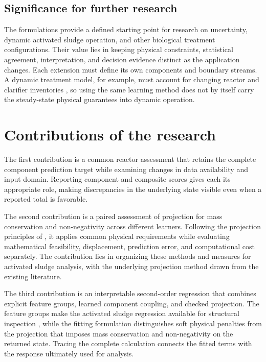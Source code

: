 \subsection{Significance for further research}

The formulations provide a defined starting point for research on uncertainty, dynamic activated sludge operation, and other biological treatment configurations. Their value lies in keeping physical constraints, statistical agreement, interpretation, and decision evidence distinct as the application changes. Each extension must define its own components and boundary streams. A dynamic treatment model, for example, must account for changing reactor and clarifier inventories \citep{Takacs1991,Alex2008}, so using the same learning method does not by itself carry the steady-state physical guarantees into dynamic operation.

\section{Contributions of the research}

The first contribution is a common reactor assessment that retains the complete component prediction target while examining changes in data availability and input domain. Reporting component and composite scores gives each its appropriate role, making discrepancies in the underlying state visible even when a reported total is favorable.

The second contribution is a paired assessment of projection for mass conservation and non-negativity across different learners. Following the projection principles of \citet{KircherVotsmeier2025}, it applies common physical requirements while evaluating mathematical feasibility, displacement, prediction error, and computational cost separately. The contribution lies in organizing these methods and measures for activated sludge analysis, with the underlying projection method drawn from the existing literature.

The third contribution is an interpretable second-order regression that combines explicit feature groups, learned component coupling, and checked projection. The feature groups make the activated sludge regression available for structural inspection \citep{Selerio2026}, while the fitting formulation distinguishes soft physical penalties from the projection that imposes mass conservation and non-negativity on the returned state. Tracing the complete calculation connects the fitted terms with the response ultimately used for analysis.

